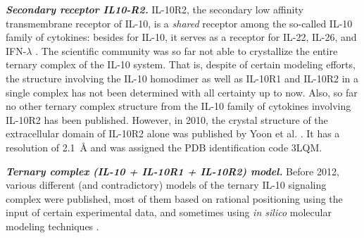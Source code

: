 \vspace{0.5cm}
\textit{\textbf{Secondary receptor IL10-R2.}}
IL-10R2, the secondary low affinity transmembrane receptor of IL-10, is a
\textit{shared} receptor among the so-called IL-10 family of cytokines: besides
for IL-10, it serves as a receptor for IL-22, IL-26, and IFN-$\lambda$
\cite{zdanov_review_2010}. The scientific community was so far not able to
crystallize the entire ternary complex of the IL-10 system. That is, despite of
certain modeling efforts, the structure involving the IL-10 homodimer as well as
IL-10R1 and IL-10R2 in a single complex has not been determined with all
certainty up to now. Also, so far no other ternary complex structure from the
IL-10 family of cytokines involving IL-10R2 has been published. However, in
2010, the crystal structure of the extracellular domain of IL-10R2 alone was
published by Yoon et al. \cite{il10r2_structure_2010}. It has a resolution of
\SI{2.1}{\angstrom} and was assigned the PDB identification code 3LQM.


\vspace{0.5cm}
\textit{\textbf{Ternary complex (IL-10 + IL-10R1 + IL-10R2) model.}}
Before 2012, various different (and contradictory) models of the ternary IL-10
signaling complex were published, most of them based on rational positioning
using the input of certain experimental data, and sometimes using \textit{in
silico} molecular modeling techniques \cite{zdanov_review_2010, Josephson2001,
yoon_samestructdifffct_2005, il10r2_conf_changes_2006, il10r2_structure_2010}.


